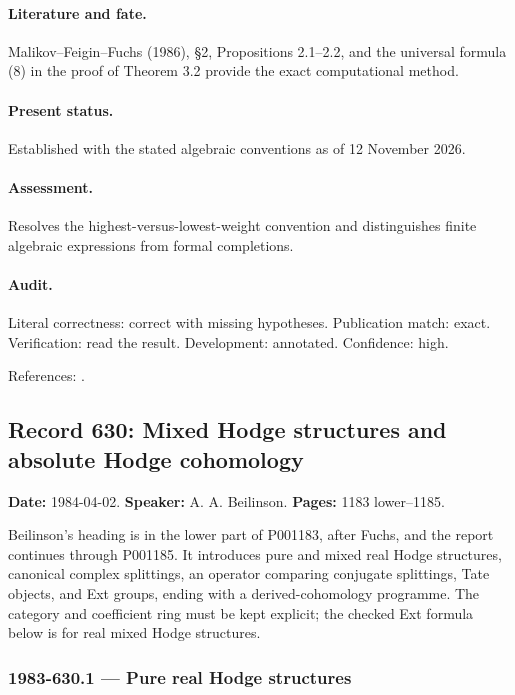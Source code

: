 \paragraph{Literature and fate.} Malikov–Feigin–Fuchs (1986), \S2, Propositions 2.1–2.2, and the universal formula (8) in the proof of Theorem 3.2 provide the exact computational method.

\paragraph{Present status.} Established with the stated algebraic conventions as of 12 November 2026.

\paragraph{Assessment.} Resolves the highest-versus-lowest-weight convention and distinguishes finite algebraic expressions from formal completions.

\paragraph{Audit.} Literal correctness: correct with missing hypotheses. Publication match: exact. Verification: read the result. Development: annotated. Confidence: high.

\noindent References: \citep{malikovfeiginfuchs1986singular}.\par

\subsection{Record 630: Mixed Hodge structures and absolute Hodge cohomology}

\label{talk:630}

\noindent\textbf{Date:} 1984-04-02. \textbf{Speaker:} A. A. Beilinson. \textbf{Pages:} 1183 lower--1185.\par

Beilinson’s heading is in the lower part of P001183, after Fuchs, and the report continues through P001185. It introduces pure and mixed real Hodge structures, canonical complex splittings, an operator comparing conjugate splittings, Tate objects, and Ext groups, ending with a derived-cohomology programme. The category and coefficient ring must be kept explicit; the checked Ext formula below is for real mixed Hodge structures.

\subsubsection{1983-630.1 --- Pure real Hodge structures}

